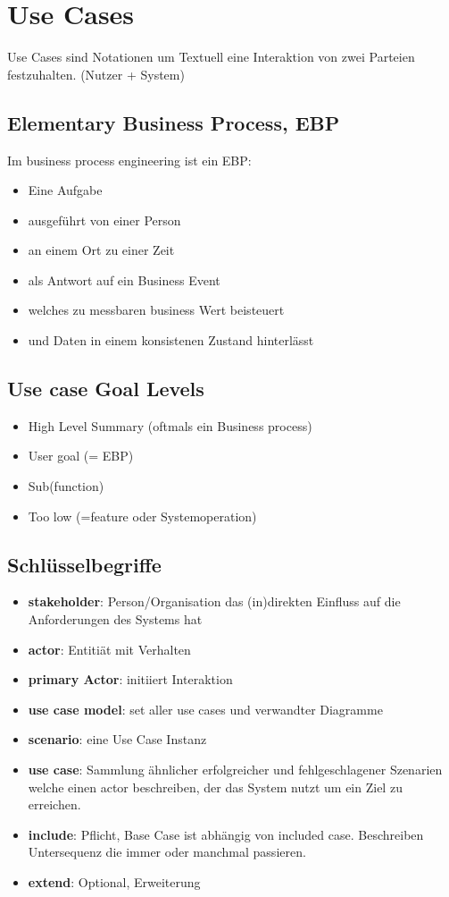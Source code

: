 \chapter{Use Cases}
Use Cases sind Notationen um Textuell eine Interaktion von
zwei Parteien festzuhalten. (Nutzer + System)

\section{Elementary Business Process, EBP}
Im business process engineering ist ein EBP:
\begin{itemize}
    \item Eine Aufgabe
    \item ausgeführt von einer Person
    \item an einem Ort zu einer Zeit
    \item als Antwort auf ein Business Event
    \item welches zu messbaren business Wert beisteuert
    \item und Daten in einem konsistenen Zustand hinterlässt
\end{itemize}

\section{Use case Goal Levels}
\begin{itemize}
    \item High Level Summary (oftmals ein Business process)
    \item User goal (= EBP)
    \item Sub(function)
    \item Too low (=feature oder Systemoperation)
\end{itemize}

\section{Schlüsselbegriffe}
\begin{itemize}
    \item \textbf{stakeholder}: Person/Organisation das (in)direkten Einfluss
    auf die Anforderungen des Systems hat
    \item \textbf{actor}: Entitiät mit Verhalten
    \item \textbf{primary Actor}: initiiert Interaktion
    \item \textbf{use case model}: set aller use cases und verwandter Diagramme
    \item \textbf{scenario}: eine Use Case Instanz
    \item \textbf{use case}: Sammlung ähnlicher erfolgreicher und fehlgeschlagener
    Szenarien welche einen actor beschreiben, der das System nutzt um ein Ziel
    zu erreichen.
    \item \textbf{include}: Pflicht, Base Case ist abhängig von included case.
    Beschreiben Untersequenz die immer oder manchmal passieren.
    \item \textbf{extend}: Optional, Erweiterung
\end{itemize}

